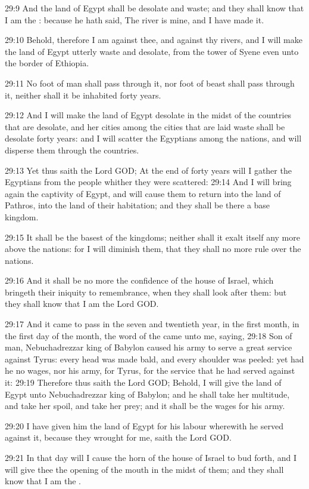 29:9 And the land of Egypt shall be desolate and waste; and they shall
know that I am the \LORD: because he hath said, The river is mine, and
I have made it.

29:10 Behold, therefore I am against thee, and against thy rivers, and
I will make the land of Egypt utterly waste and desolate, from the
tower of Syene even unto the border of Ethiopia.

29:11 No foot of man shall pass through it, nor foot of beast shall
pass through it, neither shall it be inhabited forty years.

29:12 And I will make the land of Egypt desolate in the midst of the
countries that are desolate, and her cities among the cities that are
laid waste shall be desolate forty years: and I will scatter the
Egyptians among the nations, and will disperse them through the
countries.

29:13 Yet thus saith the Lord GOD; At the end of forty years will I
gather the Egyptians from the people whither they were scattered:
29:14 And I will bring again the captivity of Egypt, and will cause
them to return into the land of Pathros, into the land of their
habitation; and they shall be there a base kingdom.

29:15 It shall be the basest of the kingdoms; neither shall it exalt
itself any more above the nations: for I will diminish them, that they
shall no more rule over the nations.

29:16 And it shall be no more the confidence of the house of Israel,
which bringeth their iniquity to remembrance, when they shall look
after them: but they shall know that I am the Lord GOD.

29:17 And it came to pass in the seven and twentieth year, in the
first month, in the first day of the month, the word of the \LORD came
unto me, saying, 29:18 Son of man, Nebuchadrezzar king of Babylon
caused his army to serve a great service against Tyrus: every head was
made bald, and every shoulder was peeled: yet had he no wages, nor his
army, for Tyrus, for the service that he had served against it: 29:19
Therefore thus saith the Lord GOD; Behold, I will give the land of
Egypt unto Nebuchadrezzar king of Babylon; and he shall take her
multitude, and take her spoil, and take her prey; and it shall be the
wages for his army.

29:20 I have given him the land of Egypt for his labour wherewith he
served against it, because they wrought for me, saith the Lord GOD.

29:21 In that day will I cause the horn of the house of Israel to bud
forth, and I will give thee the opening of the mouth in the midst of
them; and they shall know that I am the \LORD.

